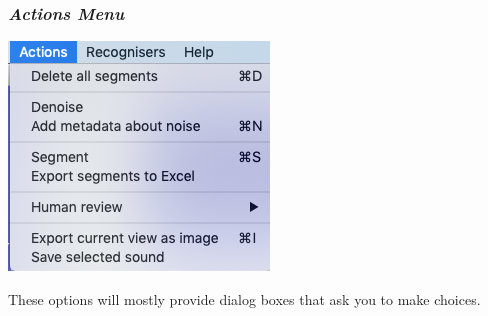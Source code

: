 \documentclass{article}
\begin{document}
\subsubsection{{\em Actions Menu}}
\label{sec:action}

\begin{center}
\includegraphics[width=.3\textwidth]{Figs/actionsmenu}
\end{center}

These options will mostly provide dialog boxes that ask you to make choices. 
\end{document}
